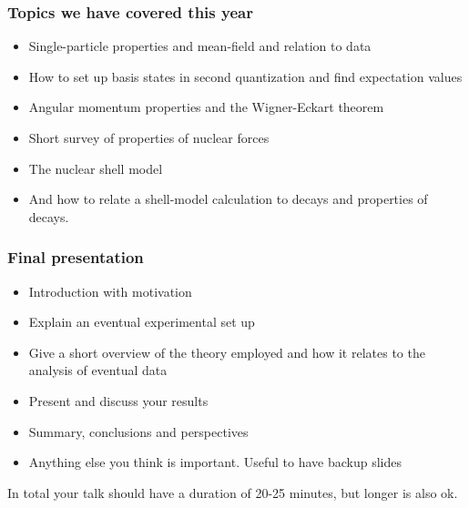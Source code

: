 \documentclass{beamer}
\begin{document}
\begin{frame}
\frametitle{Topics we have covered this year}

\begin{itemize}
\item Single-particle properties and mean-field and relation to data

\item How to set up basis states in second quantization and find expectation values

\item Angular momentum properties and the Wigner-Eckart theorem

\item Short survey of properties of nuclear forces

\item The nuclear shell model

\item And how to relate a shell-model calculation to decays and properties of decays.
\end{itemize}

\noindent
\end{frame}

\begin{frame}
\frametitle{Final presentation}

\begin{itemize}
\item Introduction with motivation

\item Explain an eventual experimental set up

\item Give a short overview of the theory employed and how it relates to the analysis of eventual data

\item Present and discuss your results

\item Summary, conclusions and perspectives

\item Anything else you think is important. Useful to have backup slides
\end{itemize}

\noindent
In total your talk should have a duration of 20-25 minutes, but longer is also ok.
\end{frame}
\end{document}
